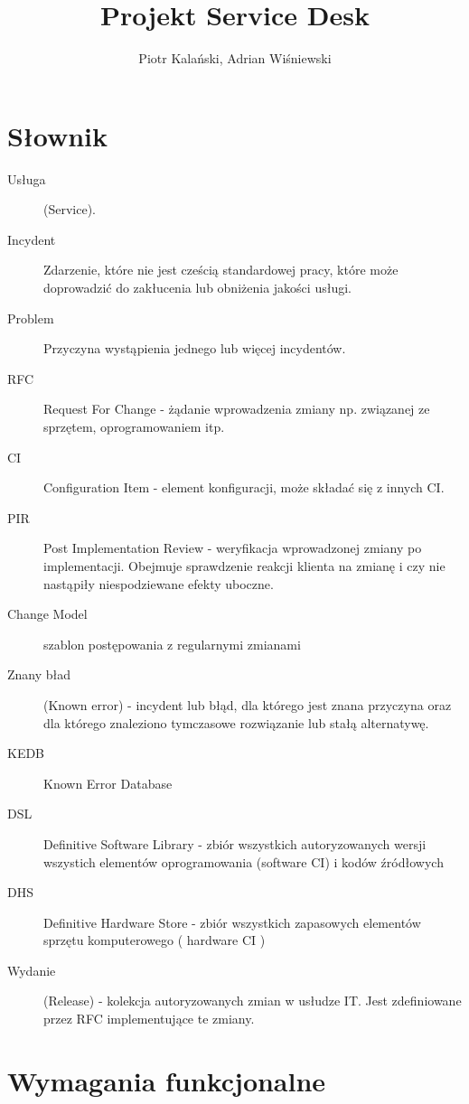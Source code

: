 \documentclass[a4paper, oneside, 11pt]{report}
\title{Projekt Service Desk}
\author{Piotr Kalański, Adrian Wiśniewski}
\begin{document}
\maketitle

\tableofcontents

\pagestyle{headings}

\chapter{Słownik}

\begin{description}
 \item[Usługa] (Service).
 \item[Incydent] Zdarzenie, które nie jest cześcią standardowej pracy, które może doprowadzić do zakłucenia lub obniżenia jakości usługi.
 \item[Problem] Przyczyna wystąpienia jednego lub więcej incydentów.
 \item[RFC] Request For Change - żądanie wprowadzenia zmiany np. związanej ze sprzętem, oprogramowaniem itp.
 \item[CI] Configuration Item - element konfiguracji, może składać się z innych CI.
 \item[PIR] Post Implementation Review - weryfikacja wprowadzonej zmiany po implementacji. Obejmuje sprawdzenie reakcji klienta na zmianę i czy nie nastąpiły niespodziewane efekty uboczne.
 \item[Change Model] szablon postępowania z regularnymi zmianami
 \item[Znany bład] (Known error) - incydent lub błąd, dla którego jest znana przyczyna oraz dla którego znaleziono tymczasowe rozwiązanie lub stałą alternatywę.
 \item[KEDB] Known Error Database
 \item[DSL] Definitive Software Library - zbiór wszystkich autoryzowanych wersji wszystich elementów oprogramowania (software CI) i kodów źródłowych
 \item[DHS] Definitive Hardware Store - zbiór wszystkich zapasowych elementów sprzętu komputerowego ( hardware CI )
 \item[Wydanie] (Release) - kolekcja autoryzowanych zmian w usłudze IT. Jest zdefiniowane przez RFC implementujące te zmiany.
\end{description}

\chapter{Wymagania funkcjonalne}
\end{document}
